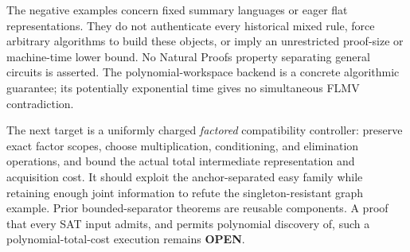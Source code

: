 \documentclass[11pt]{article}
\begin{document}
The negative examples concern fixed summary languages or eager flat
representations. They do not authenticate every historical mixed rule,
force arbitrary algorithms to build these objects, or imply an
unrestricted proof-size or machine-time lower bound. No Natural Proofs
property separating general circuits is asserted.
The polynomial-workspace backend is a concrete algorithmic guarantee;
its potentially exponential time gives no simultaneous FLMV
contradiction.

The next target is a uniformly charged \emph{factored} compatibility
controller: preserve exact factor scopes, choose multiplication,
conditioning, and elimination operations, and bound the actual total
intermediate representation and acquisition cost. It should exploit
the anchor-separated easy family while retaining enough joint
information to refute the singleton-resistant graph example.
Prior bounded-separator theorems are reusable components.
A proof that every SAT input admits, and permits polynomial discovery
of, such a polynomial-total-cost execution remains \textbf{OPEN}.



\end{document}
